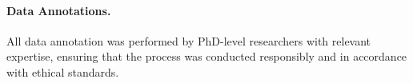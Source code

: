 \documentclass{llmxive}
\begin{document}
\paragraph{Data Annotations.}

All data annotation was performed by PhD-level researchers with relevant expertise, ensuring that the process was conducted responsibly and in accordance with ethical standards.











  
  


% 



\end{document}
